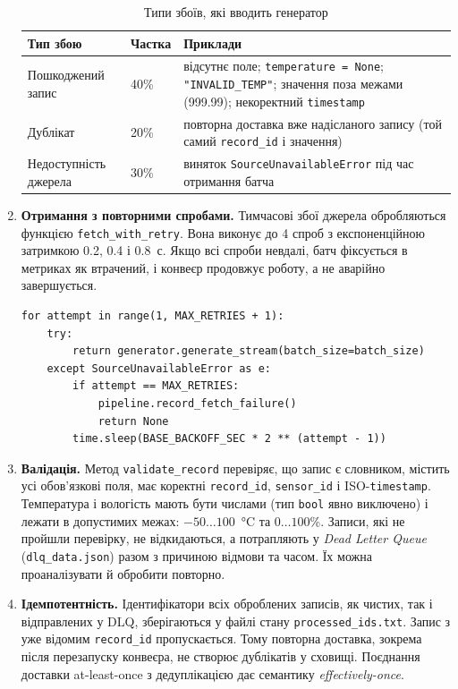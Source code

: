 \begin{enumerate}
\begin{table}[H]
\centering
\caption{Типи збоїв, які вводить генератор}
\label{tab:faults}
\begin{tabular}{>{\raggedright\arraybackslash}p{3.4cm}p{1.4cm}>{\raggedright\arraybackslash}p{9.4cm}}
\toprule
Тип збою & Частка & Приклади \\
\midrule
Пошкоджений запис & 40\% & відсутнє поле; \texttt{temperature = None}; \texttt{"INVALID\_TEMP"}; значення поза межами (999.99); некоректний \texttt{timestamp} \\
Дублікат & 20\% & повторна доставка вже надісланого запису (той самий \texttt{record\_id} і значення) \\
Недоступність джерела & 30\% & виняток \texttt{SourceUnavailableError} під час отримання батча \\
\bottomrule
\end{tabular}
\end{table}

  \item \textbf{Отримання з повторними спробами.} Тимчасові збої джерела обробляються функцією \texttt{fetch\_with\_retry}. Вона виконує до 4 спроб з експоненційною затримкою 0.2, 0.4 і 0.8~с. Якщо всі спроби невдалі, батч фіксується в метриках як втрачений, і конвеєр продовжує роботу, а не аварійно завершується.
\begin{Verbatim}
for attempt in range(1, MAX_RETRIES + 1):
    try:
        return generator.generate_stream(batch_size=batch_size)
    except SourceUnavailableError as e:
        if attempt == MAX_RETRIES:
            pipeline.record_fetch_failure()
            return None
        time.sleep(BASE_BACKOFF_SEC * 2 ** (attempt - 1))
\end{Verbatim}

  \item \textbf{Валідація.} Метод \texttt{validate\_record} перевіряє, що запис є словником, містить усі обов'язкові поля, має коректні \texttt{record\_id}, \texttt{sensor\_id} і ISO-\texttt{timestamp}. Температура і вологість мають бути числами (тип \texttt{bool} явно виключено) і лежати в допустимих межах: \(-50 \ldots 100\)~°C та \(0 \ldots 100\)\%. Записи, які не пройшли перевірку, не відкидаються, а потрапляють у \emph{Dead Letter Queue} (\texttt{dlq\_data.json}) разом з причиною відмови та часом. Їх можна проаналізувати й обробити повторно.

  \item \textbf{Ідемпотентність.} Ідентифікатори всіх оброблених записів, як чистих, так і відправлених у DLQ, зберігаються у файлі стану \texttt{processed\_ids.txt}. Запис з уже відомим \texttt{record\_id} пропускається. Тому повторна доставка, зокрема після перезапуску конвеєра, не створює дублікатів у сховищі. Поєднання доставки at-least-once з дедуплікацією дає семантику \emph{effectively-once}.


\end{enumerate}
